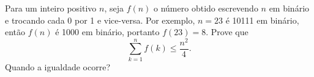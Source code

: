 Para um inteiro positivo \(n\), seja \(f(n)\) o número obtido escrevendo \(n\) em binário e trocando cada 0 por 1 e vice-versa. Por exemplo, \(n=23\) é 10111 em binário, então \(f(n)\) é 1000 em binário, portanto \(f(23) =8\). Prove que
\[\sum_{k=1}^n f(k) \leq \frac{n^2}{4}.\]
Quando a igualdade ocorre?
